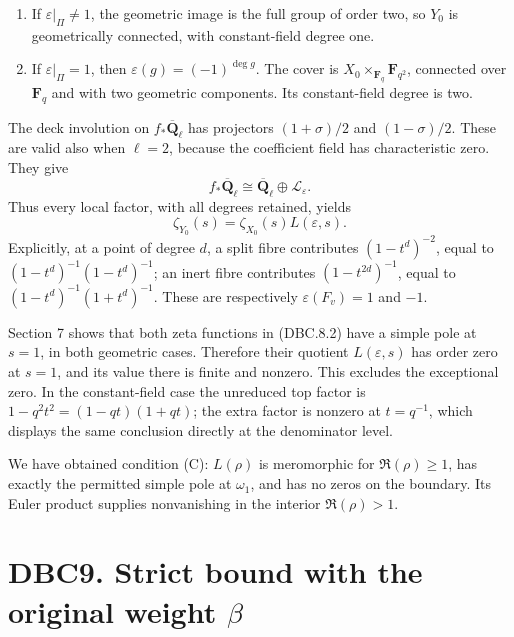 \documentclass[
]{report}
\providecommand{\tightlist}{%
  \setlength{\itemsep}{0pt}\setlength{\parskip}{0pt}}
\begin{document}
\begin{enumerate}
\def\labelenumi{\arabic{enumi}.}
\tightlist
\item
  If \(\varepsilon|_\Pi\ne1\), the geometric image is the full group of
  order two, so \(Y_0\) is geometrically connected, with constant-field
  degree one.
\item
  If \(\varepsilon|_\Pi=1\), then \(\varepsilon(g)=(-1)^{\deg g}\). The
  cover is \(X_0\times_{\mathbf F_q}\mathbf F_{q^2}\), connected over
  \(\mathbf F_q\) and with two geometric components. Its constant-field
  degree is two.
\end{enumerate}

The deck involution on \(f_*\overline{\mathbf Q}_\ell\) has projectors
\((1+\sigma)/2\) and \((1-\sigma)/2\). These are valid also when
\(\ell=2\), because the coefficient field has characteristic zero. They
give \[
f_*\overline{\mathbf Q}_\ell\cong
\overline{\mathbf Q}_\ell\oplus\mathcal L_\varepsilon.
\tag{DBC.8.1}
\] Thus every local factor, with all degrees retained, yields \[
\zeta_{Y_0}(s)=\zeta_{X_0}(s)L(\varepsilon,s).
\tag{DBC.8.2}
\] Explicitly, at a point of degree \(d\), a split fibre contributes
\((1-t^d)^{-2}\), equal to \((1-t^d)^{-1}(1-t^d)^{-1}\); an inert fibre
contributes \((1-t^{2d})^{-1}\), equal to \((1-t^d)^{-1}(1+t^d)^{-1}\).
These are respectively \(\varepsilon(F_v)=1\) and \(-1\).

Section 7 shows that both zeta functions in (DBC.8.2) have a simple pole
at \(s=1\), in both geometric cases. Therefore their quotient
\(L(\varepsilon,s)\) has order zero at \(s=1\), and its value there is
finite and nonzero. This excludes the exceptional zero. In the
constant-field case the unreduced top factor is
\(1-q^2t^2=(1-qt)(1+qt)\); the extra factor is nonzero at \(t=q^{-1}\),
which displays the same conclusion directly at the denominator level.

We have obtained condition (C): \(L(\rho)\) is meromorphic for
\(\Re(\rho)\ge1\), has exactly the permitted simple pole at
\(\omega_1\), and has no zeros on the boundary. Its Euler product
supplies nonvanishing in the interior \(\Re(\rho)>1\).

\section{\texorpdfstring{DBC9. Strict bound with the original weight
\(\beta\)}{DBC9. Strict bound with the original weight \textbackslash beta}}\label{dbc9.-strict-bound-with-the-original-weight-beta}
\end{document}
